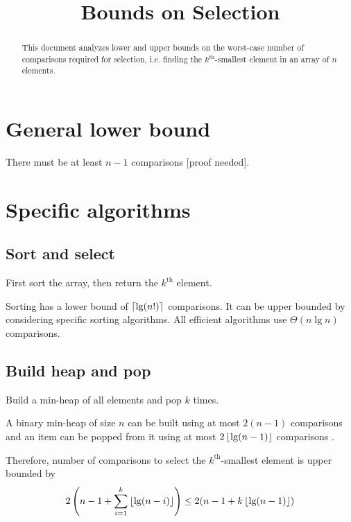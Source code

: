 

\title{Bounds on Selection}



\maketitle

\begin{abstract}
This document analyzes lower and upper bounds on the worst-case number of comparisons required for selection,
i.e. finding the $k^{\textrm{th}}$-smallest element in an array of $n$ elements.
\end{abstract}

\initFromContents{}

\section{General lower bound}

There must be at least $n-1$ comparisons [proof needed].

\section{Specific algorithms}

\subsection{Sort and select}

First sort the array, then return the $k^{\textrm{th}}$ element.

Sorting has a lower bound of $\left\lceil \lg(n!) \right\rceil$ comparisons.
It can be upper bounded by considering specific sorting algorithms.
All efficient algorithms use $\Theta(n\lg n)$ comparisons.

\subsection{Build heap and pop}

Build a min-heap of all elements and pop $k$ times.

A binary min-heap of size $n$ can be built using at most $2(n-1)$ comparisons and an item can be
popped from it using at most $2\left\lfloor \lg (n-1) \right\rfloor$ comparisons \cite{eku-notes:heaps}.

Therefore, number of comparisons to select the $k^{\textrm{th}}$-smallest element is upper bounded by
\[ 2\left( n-1 + \sum_{i=1}^k \left\lfloor \lg(n-i) \right\rfloor \right)
\le 2(n-1 + k\left\lfloor \lg(n-1) \right\rfloor) \]

